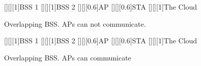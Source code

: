 \documentclass[11pt]{article}
\begin{document}
\begin{figure}[t!]
	[][][1]{BSS 1}
	[][][1]{BSS 2}	
	[][][0.6]{AP}
	[][][0.6]{STA}
	[][][1]{The Cloud}	

	\centering
	\caption{Overlapping BSS. APs can not communicate.}\label{Fig:Fig_Case2}
\end{figure}

\begin{figure}[t!]
	[][][1]{BSS 1}
	[][][1]{BSS 2}	
	[][][0.6]{AP}
	[][][0.6]{STA}
	[][][1]{The Cloud}	

	\centering
	\caption{Overlapping BSS. APs can communicate}\label{Fig:Fig_Case3}
\end{figure}
\end{document}
